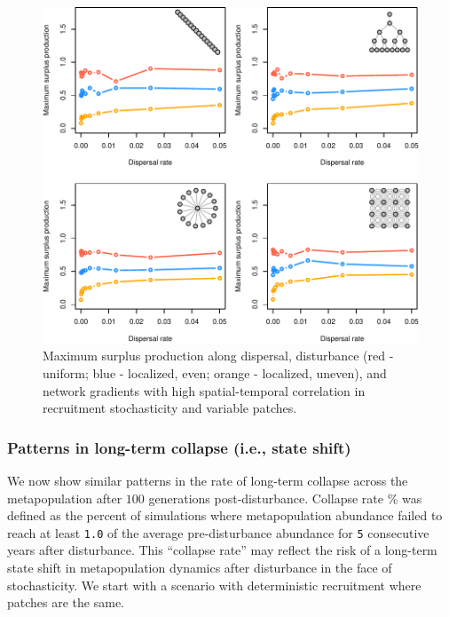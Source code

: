 \documentclass[
]{article}
\begin{document}
\begin{figure}[H]

{\centering \includegraphics{Managing_for_ecological_surprises_in_metapopulations_files/figure-latex/MSY with variable patches and space-time stochasticity-1} 

}

\caption{Maximum surplus production along dispersal, disturbance (red - uniform; blue - localized, even; orange - localized, uneven), and network gradients with high spatial-temporal correlation in recruitment stochasticity and variable patches.}\label{fig:MSY with variable patches and space-time stochasticity}
\end{figure}

\newpage

\hypertarget{patterns-in-long-term-collapse-i.e.-state-shift}{%
\subsubsection{Patterns in long-term collapse (i.e., state
shift)}\label{patterns-in-long-term-collapse-i.e.-state-shift}}

We now show similar patterns in the rate of long-term collapse across
the metapopulation after \(100\) generations post-disturbance. Collapse
rate \% was defined as the percent of simulations where metapopulation
abundance failed to reach at least \texttt{1.0} of the average
pre-disturbance abundance for \texttt{5} consecutive years after
disturbance. This ``collapse rate'' may reflect the risk of a long-term
state shift in metapopulation dynamics after disturbance in the face of
stochasticity. We start with a scenario with deterministic recruitment
where patches are the same.
\end{document}
